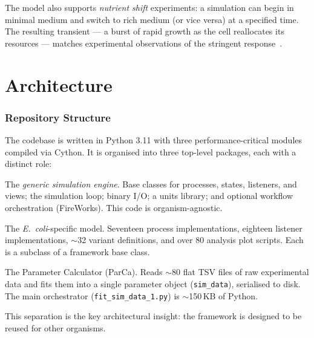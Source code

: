 \documentclass[11pt,a4paper]{article}
\begin{document}
The model also supports \emph{nutrient shift} experiments: a simulation can
begin in minimal medium and switch to rich medium (or vice versa) at a
specified time.  The resulting transient --- a burst of rapid growth as the
cell reallocates its resources --- matches experimental observations of
the stringent response~\cite{AhnHorst2022}.


\part{Architecture}

\section{Repository Structure}

The codebase is written in Python 3.11 with three performance-critical modules
compiled via Cython.  It is organised into three top-level packages, each with
a distinct role:

\begin{description}[style=nextline, leftmargin=2cm]
  \item[\texttt{wholecell/}]
    The \emph{generic simulation engine}.  Base classes for processes, states,
    listeners, and views; the simulation loop; binary I/O; a units library;
    and optional workflow orchestration (FireWorks).  This code is
    organism-agnostic.

  \item[\texttt{models/ecoli/}]
    The \textit{E.~coli}-specific model.  Seventeen process implementations,
    eighteen listener implementations, $\sim$32 variant definitions, and over
    80 analysis plot scripts.  Each is a subclass of a framework base class.

  \item[\texttt{reconstruction/ecoli/}]
    The Parameter Calculator (ParCa).  Reads $\sim$80 flat TSV files of raw
    experimental data and fits them into a single parameter object
    (\texttt{sim\_data}), serialised to disk.  The main orchestrator
    (\texttt{fit\_sim\_data\_1.py}) is $\sim$150\,KB of Python.
\end{description}

This separation is the key architectural insight: the framework is designed to
be reused for other organisms.
\end{document}

